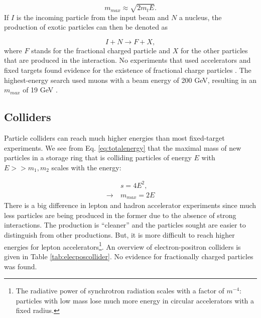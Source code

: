 \begin{equation}
\label{eq:mmax}
m_{max} \approx \sqrt{2 m_t E}.
\end{equation}
If $I$ is the incoming particle from the input beam and $N$ a nucleus, the production of exotic particles can then be denoted as

\begin{equation}
I + N \rightarrow F + X,
\end{equation}
where $F$ stands for the fractional charged particle and $X$ for the other particles that are produced in the interaction. No experiments that used accelerators and fixed targets found evidence for the existence of fractional charge particles \cite{Lyons:1984pw}. The highest-energy search used muons with a beam energy of 200 GeV, resulting in an $m_{max}$ of 19 GeV \cite{Aubert:1983jy}.
\subsection{Colliders}
Particle colliders can reach much higher energies than most fixed-target experiments. We see from Eq. \ref{eq:totalenergy} that the maximal mass of new particles in a storage ring that is colliding particles of energy $E$ with $E>>m_1,m_2$ scales with the energy: 

\begin{equation}
\begin{split}
&s = 4E^2,\\
\rightarrow \ &m_{max} = 2E
\end{split}
\end{equation}
There is a big difference in lepton and hadron accelerator experiments since much less particles are being produced in the former due to the absence of strong interactions. The production is ``cleaner'' and the particles sought are easier to distinguish from other productions. But, it is more difficult to reach higher energies for lepton accelerators\footnote{The radiative power of synchrotron radiation scales with a factor of $m^{-4}$: particles with low mass lose much more energy in circular accelerators with a fixed radius.}. An overview of electron-positron colliders is given in Table \ref{tab:elecposcollider}. No evidence for fractionally charged particles was found.


